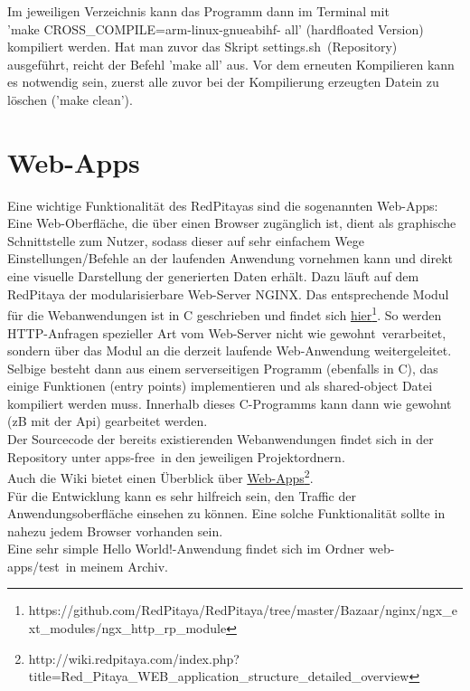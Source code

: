 \documentclass[11pt]{scrartcl}
\begin{document}


Im jeweiligen Verzeichnis kann das Programm dann im Terminal mit \\'make CROSS\_COMPILE=arm-linux-gnueabihf- all' (hardfloated Version) kompiliert werden. Hat man zuvor das Skript \grqq settings.sh\grqq~(Repository) ausgeführt, reicht der Befehl 'make all' aus. Vor dem erneuten Kompilieren kann es notwendig sein, zuerst alle zuvor bei der Kompilierung erzeugten Datein zu löschen ('make clean').

\section{Web-Apps}
Eine wichtige Funktionalität des RedPitayas sind die sogenannten Web-Apps:\\
Eine Web-Oberfläche, die über einen Browser zugänglich ist, dient als graphische Schnittstelle zum Nutzer, sodass dieser auf sehr einfachem Wege Einstellungen/Befehle an der laufenden Anwendung vornehmen kann und direkt eine visuelle Darstellung der generierten Daten erhält. Dazu läuft auf dem RedPitaya der modularisierbare Web-Server NGINX. Das entsprechende Modul für die Webanwendungen ist in C geschrieben und findet sich \href{https://github.com/RedPitaya/RedPitaya/tree/master/Bazaar/nginx/ngx_ext_modules/ngx_http_rp_module}{hier\footnote{https://github.com/RedPitaya/RedPitaya/tree/master/Bazaar/nginx/ngx\_ext\_modules/ngx\_http\_rp\_module}}. So werden HTTP-Anfragen spezieller Art vom Web-Server nicht \grqq wie gewohnt\grqq~verarbeitet, sondern über das Modul an die derzeit laufende Web-Anwendung weitergeleitet. Selbige besteht dann aus einem serverseitigen Programm (ebenfalls in C), das einige Funktionen (\grqq entry points\grqq ) implementieren und als shared-object Datei kompiliert werden muss. Innerhalb dieses C-Programms kann dann wie gewohnt (zB mit der Api) gearbeitet werden.\\
Der Sourcecode der bereits existierenden Webanwendungen findet sich in der Repository unter \grqq apps-free\grqq~in den jeweiligen Projektordnern.\\
Auch die Wiki bietet einen Überblick über \href{http://wiki.redpitaya.com/index.php?title=Red_Pitaya_WEB_application_structure_detailed_overview}{Web-Apps\footnote{http://wiki.redpitaya.com/index.php?title=Red\_Pitaya\_WEB\_application\_structure\_detailed\_overview}}.\\
Für die Entwicklung kann es sehr hilfreich sein, den Traffic der Anwendungsoberfläche einsehen zu können. Eine solche Funktionalität sollte in nahezu jedem Browser vorhanden sein.\\
Eine sehr simple \grqq Hello World!\grqq -Anwendung findet sich im Ordner \grqq web-apps/test\grqq~in meinem Archiv.
\end{document}
